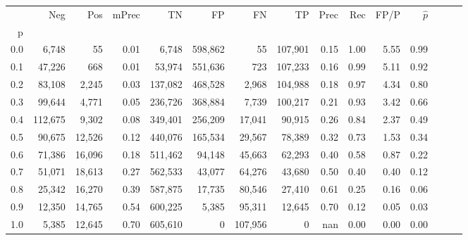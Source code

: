 \begin{tabular}{rrrrrrrrrrrrrrr}
\toprule
{} &      Neg &     Pos & mPrec &       TN &       FP &       FN &       TP &  Prec &   Rec &  FP/P & $\hat{p}$ \\
p   &          &         &       &          &          &          &          &       &       &       &           \\
\midrule
0.0 &    6,748 &      55 &  0.01 &    6,748 &  598,862 &       55 &  107,901 &  0.15 &  1.00 &  5.55 &      0.99 \\
0.1 &   47,226 &     668 &  0.01 &   53,974 &  551,636 &      723 &  107,233 &  0.16 &  0.99 &  5.11 &      0.92 \\
0.2 &   83,108 &   2,245 &  0.03 &  137,082 &  468,528 &    2,968 &  104,988 &  0.18 &  0.97 &  4.34 &      0.80 \\
0.3 &   99,644 &   4,771 &  0.05 &  236,726 &  368,884 &    7,739 &  100,217 &  0.21 &  0.93 &  3.42 &      0.66 \\
0.4 &  112,675 &   9,302 &  0.08 &  349,401 &  256,209 &   17,041 &   90,915 &  0.26 &  0.84 &  2.37 &      0.49 \\
0.5 &   90,675 &  12,526 &  0.12 &  440,076 &  165,534 &   29,567 &   78,389 &  0.32 &  0.73 &  1.53 &      0.34 \\
0.6 &   71,386 &  16,096 &  0.18 &  511,462 &   94,148 &   45,663 &   62,293 &  0.40 &  0.58 &  0.87 &      0.22 \\
0.7 &   51,071 &  18,613 &  0.27 &  562,533 &   43,077 &   64,276 &   43,680 &  0.50 &  0.40 &  0.40 &      0.12 \\
0.8 &   25,342 &  16,270 &  0.39 &  587,875 &   17,735 &   80,546 &   27,410 &  0.61 &  0.25 &  0.16 &      0.06 \\
0.9 &   12,350 &  14,765 &  0.54 &  600,225 &    5,385 &   95,311 &   12,645 &  0.70 &  0.12 &  0.05 &      0.03 \\
1.0 &    5,385 &  12,645 &  0.70 &  605,610 &        0 &  107,956 &        0 &   nan &  0.00 &  0.00 &      0.00 \\
\bottomrule
\end{tabular}
